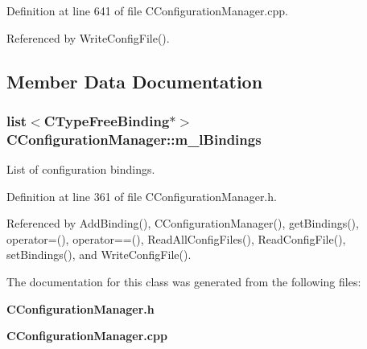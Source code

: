 Definition at line 641 of file CConfiguration\-Manager.cpp.

Referenced by Write\-Config\-File().

\subsection{Member Data Documentation}
\subsubsection{\setlength{\rightskip}{0pt plus 5cm}list$<${\bf CType\-Free\-Binding}$\ast$$>$ CConfiguration\-Manager::m\_\-l\-Bindings\hspace{0.3cm}{\tt  [private]}}\label{classCConfigurationManager_o0}


List of configuration bindings.



Definition at line 361 of file CConfiguration\-Manager.h.

Referenced by Add\-Binding(), CConfiguration\-Manager(), get\-Bindings(), operator=(), operator==(), Read\-All\-Config\-Files(), Read\-Config\-File(), set\-Bindings(), and Write\-Config\-File().

The documentation for this class was generated from the following files:\begin{CompactItemize}
\item 
{\bf CConfiguration\-Manager.h}\item 
{\bf CConfiguration\-Manager.cpp}\end{CompactItemize}
